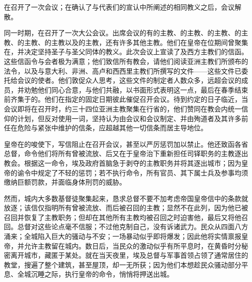 在召开了一次会议；在确认了与代表们的宣认中所阐述的相同教义之后，会议解散。\par

同一时期，在召开了一次大公会议。出席会议的有的主教、的主教、的主教、的主教、的主教、的主教以及的主教，还有许多其他主教。他们在皇帝在位期间曾聚集在，并决定坚持圣子与圣父同体的教义。此次会议上宣读了及西方主教们的信函。这些信函令与会者极为满意；他们致信所有教会，请他们阅读亚洲主教们所颁布的法令，以及与意大利、非洲、高卢和西西里主教们所撰写的文件——这些文件已委托给会议的使者。他们敦促众人思考，这些文件的制定者人数众多，远超会议的成员，并劝勉他们同心合意，与他们共融，以书面形式表明这一点，最后在春季结束前齐集于的。他们在指定的固定日期彼此催促召开会议。待到约定的日子临近，当会议即将在召开时，约三十四位亚洲主教聚集在行省的，他们赞同在教会内统一信仰的计划，但反对使用一词，坚持认为由会议和会议制定、并由殉道者及其许多前任在危险与紧张中维护的信条，应超越其他一切信条而居主导地位。\par

皇帝在的唆使下，写信阻止在召开会议，甚至以严厉惩罚加以禁止。他还致函各省总督，命令他们将所有曾被流放、后又在于皇帝治下重新担任司铎职务的主教逐出教会。根据这一命令，埃及政府首脑急于剥夺的主教职务并将其逐出城市；因为皇帝的谕令中规定了不轻的惩罚；若不执行命令，所有官员、其下属士兵及参事均须缴纳巨额罚款，并面临身体刑罚的威胁。\par

然而，城内大多数基督徒聚集起来，恳求总督不要不加考虑帝国皇帝信中的条款就放逐；该信仅指明所有曾被流放、而后被召回的主教；显然不在此列，因为他已被召回并恢复了主教职务；但却在其他所有主教均被召回之时迫害他，最后又将他召回。总督对这些论点毫不信服；不过他克制自己，没有诉诸武力。民众从四面八方涌来；全城陷入巨大的骚动与不安；一场暴动似乎即将爆发；因此他将实情禀报皇帝，并允许主教留在城内。数日后，当民众的激动似乎有所平息时，在黄昏时分秘密离开城市，藏匿于某处。就在当天夜里，埃及总督与军事首领占领了通常居住的教堂，搜遍了整个建筑，甚至屋顶，却一无所获；因为他们本想趁民众骚动部分平息、全城沉睡之际，执行皇帝的命令，悄悄将押送出城。\par

